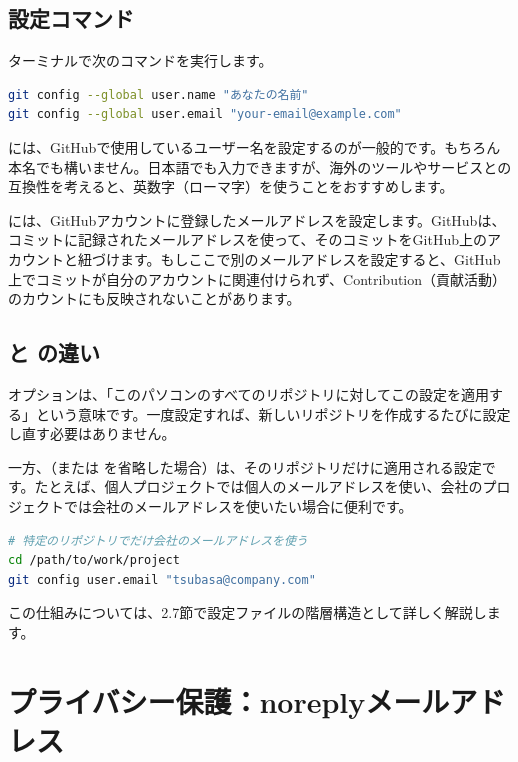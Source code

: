 \subsection{設定コマンド}

ターミナルで次のコマンドを実行します。

\begin{lstlisting}[language=bash]
git config --global user.name "あなたの名前"
git config --global user.email "your-email@example.com"
\end{lstlisting}

 には、GitHubで使用しているユーザー名を設定するのが一般的です。もちろん本名でも構いません。日本語でも入力できますが、海外のツールやサービスとの互換性を考えると、英数字（ローマ字）を使うことをおすすめします。

 には、GitHubアカウントに登録したメールアドレスを設定します。GitHubは、コミットに記録されたメールアドレスを使って、そのコミットをGitHub上のアカウントと紐づけます。もしここで別のメールアドレスを設定すると、GitHub上でコミットが自分のアカウントに関連付けられず、Contribution（貢献活動）のカウントにも反映されないことがあります。

\subsection{ と  の違い}

 オプションは、「このパソコンのすべてのリポジトリに対してこの設定を適用する」という意味です。一度設定すれば、新しいリポジトリを作成するたびに設定し直す必要はありません。

一方、（または  を省略した場合）は、そのリポジトリだけに適用される設定です。たとえば、個人プロジェクトでは個人のメールアドレスを使い、会社のプロジェクトでは会社のメールアドレスを使いたい場合に便利です。

\begin{lstlisting}[language=bash]
# 特定のリポジトリでだけ会社のメールアドレスを使う
cd /path/to/work/project
git config user.email "tsubasa@company.com"
\end{lstlisting}

この仕組みについては、2.7節で設定ファイルの階層構造として詳しく解説します。

\section{プライバシー保護：noreplyメールアドレス}

